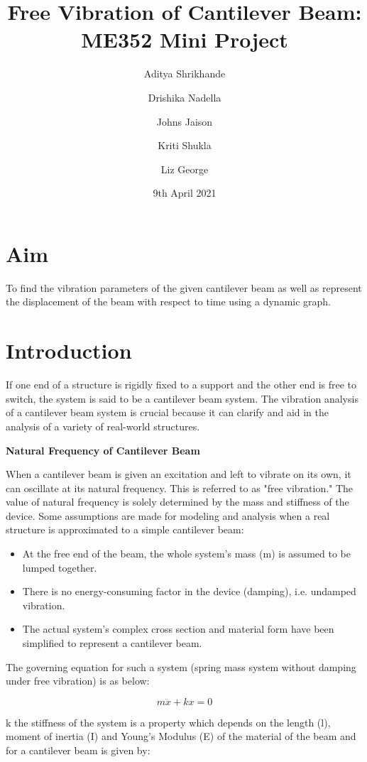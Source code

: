 \documentclass{report}
\title{Free Vibration of Cantilever Beam: ME352 Mini Project}
\author[1]{Aditya Shrikhande}
\author[2]{Drishika Nadella}
\author[3]{Johns Jaison}
\author[4]{Kriti Shukla}
\author[5]{Liz George}
\affil[1]{181ME204, Department of Mechanical Engineering, NITK}
\affil[2]{181ME222, Department of Mechanical Engineering, NITK}
\affil[3]{181ME234, Department of Mechanical Engineering, NITK}
\affil[4]{181ME239, Department of Mechanical Engineering, NITK}
\affil[5]{181ME241, Department of Mechanical Engineering, NITK}
\date{9th April 2021}
\begin{document}
\maketitle

\section{Aim}

To find the vibration parameters of the given cantilever beam as well as represent the displacement of the beam with respect to time using a dynamic graph.

\section{Introduction}

If one end of a structure is rigidly fixed to a support and the other end is free to switch, the system is said to be a cantilever beam system. The vibration analysis of a cantilever beam system is crucial because it can clarify and aid in the analysis of a variety of real-world structures.
\bigskip

{\bfseries Natural Frequency of Cantilever Beam}

\bigskip
When a cantilever beam is given an excitation and left to vibrate on its own, it can oscillate at its natural frequency. This is referred to as "free vibration." The value of natural frequency is solely determined by the mass and stiffness of the device. Some assumptions are made for modeling and analysis when a real structure is approximated to a simple cantilever beam: 

\begin{itemize}
 \item At the free end of the beam, the whole system's mass (m) is assumed to be lumped together.
 \item There is no energy-consuming factor in the device (damping), i.e. undamped vibration.
 \item The actual system's complex cross section and material form have been simplified to represent a cantilever beam.
\end{itemize}

The governing equation for such a system (spring mass system without damping under free vibration) is as below:

$$ m \ddot{x} + kx = 0$$

k the stiffness of the system is a property which depends on the length (l), moment of inertia (I) and Young's Modulus (E) of the material of the beam and for a cantilever beam is given by:
\end{document}
